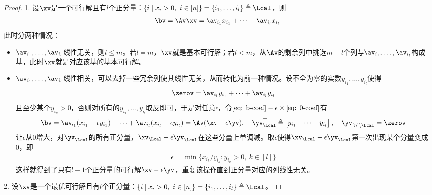 \documentclass{ctexart}
\begin{document}
\begin{proof}
    1. 设$\xv$是一个可行解且有$l$个正分量：$\{ i \mid x_i > 0, ~ i \in [n] \} = \{ i_1, \ldots, i_l \} \triangleq \Lcal$，则
    \begin{align} \label{eq: b-coef}
        \bv = \Av \xv = \av_{i_1} x_{i_1} + \cdots + \av_{i_l} x_{i_l}
    \end{align}
    此时分两种情况：
    \begin{itemize}
        \item $\av_{i_1}, \ldots, \av_{i_l}$线性无关，则$l \le m$。若$l = m$，$\xv$就是基本可行解；若$l < m$，从$\Av$的剩余列中挑选$m-l$个列与$\av_{i_1}, \ldots, \av_{i_l}$构成基，此时$\xv$就是对应该基的基本可行解。
        \item $\av_{i_1}, \ldots, \av_{i_l}$线性相关，可以去掉一些冗余列使其线性无关，从而转化为前一种情况。设不全为零的实数$y_{i_1}, \ldots, y_{i_l}$使得
              \begin{align} \label{eq: 0-coef}
                  \zerov = \av_{i_1} y_{i_1} + \cdots + \av_{i_l} y_{i_l}
              \end{align}
              且至少某个$y_{i_k} > 0$，否则对所有的$y_{i_1}, \ldots, y_{i_l}$取反即可，于是对任意$\epsilon$，令$\eqref{eq: b-coef} - \epsilon \times \eqref{eq: 0-coef}$有
              \begin{align*}
                  \bv = \av_{i_1} (x_{i_1} - \epsilon y_{i_1}) + \cdots + \av_{i_l} (x_{i_l} - \epsilon y_{i_l}) = \Av (\xv - \epsilon \yv), \quad
                  \yv_\Lcal^\top \triangleq
                  \begin{bmatrix}
                      y_{i_1} & \cdots & y_{i_l}
                  \end{bmatrix}, \quad \yv_{[n] \setminus \Lcal} = \zerov
              \end{align*}
              让$\epsilon$从$0$增大，对$\yv_\Lcal$的所有正分量，$\xv_\Lcal - \epsilon \yv_\Lcal$在这些分量上单调减。取$\epsilon$使得$\xv_\Lcal - \epsilon \yv_\Lcal$第一次出现某个分量变成$0$，即
              \begin{align*}
                  \epsilon = \min \{ x_{i_k} / y_{i_k} : y_{i_k} > 0, ~ k \in [l] \}
              \end{align*}
              这样就得到了只有$l-1$个正分量的可行解$\xv - \epsilon \yv$，重复该操作直到正分量对应的列线性无关。
    \end{itemize}

    2. 设$\xv$是一个最优可行解且有$l$个正分量：$\{ i \mid x_i > 0, ~ i \in [n] \} = \{ i_1, \ldots, i_l \} \triangleq \Lcal$。


\end{proof}
\end{document}
